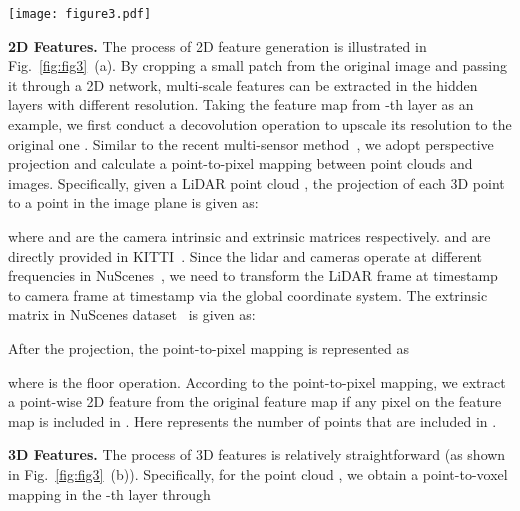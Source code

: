\documentclass[runningheads]{llncs}
\begin{document}
	
	\begin{figure*}[t]
		\begin{centering}
			\texttt{[image: figure3.pdf]}
			\caption{\textbf{2D and 3D feature generation.} 
Part (a) demonstrates the 2D feature generation, where the point cloud will first be projected onto the image patch and generate the point-to-pixel (P2P) mapping.
After that, it transfers the 2D feature map to the point-wise 2D features according to P2P mapping.
Part (b) shows the 3D feature generation.
The point-to-voxel (P2V) mapping is easy to obtain, and the voxel features will be interpolated onto the point cloud.
			}
			\label{fig:fig3}
		\end{centering}	
	\end{figure*}
	
	
	\noindent\textbf{2D Features.}
The process of 2D feature generation is illustrated in Fig.~\ref{fig:fig3}~(a).
By cropping a small patch  from the original image and passing it through a 2D network, multi-scale features can be extracted in the hidden layers with different resolution.
Taking the feature map  from -th layer as an example, we first conduct a decovolution operation to upscale its resolution to the original one .
Similar to the recent multi-sensor method~\cite{zhuang2021perception}, we adopt perspective projection and calculate a point-to-pixel mapping between point clouds and images.
Specifically, given a LiDAR point cloud , the projection of each 3D point  to a point  in the image plane is given as:
	
	where  and  are the camera intrinsic and extrinsic matrices respectively.
 and  are directly provided in KITTI~\cite{geiger2012cvpr}.
Since the lidar and cameras operate at different frequencies in NuScenes~\cite{nuscenes}, we need to transform the LiDAR frame at timestamp  to camera frame at timestamp  via the global coordinate system.
	The extrinsic matrix  in NuScenes dataset~\cite{nuscenes} is given as:
	
After the projection, the point-to-pixel mapping is represented as 
	
	where  is the floor operation.
According to the point-to-pixel mapping, we extract a point-wise 2D feature  from the original feature map  if any pixel on the feature map is included in .
Here  represents the number of points that are included in .
	
	\noindent\textbf{3D Features.}
	The process of 3D features is relatively straightforward (as shown in Fig.~\ref{fig:fig3}~(b)).
Specifically, for the point cloud , we obtain a point-to-voxel mapping in the -th layer through  
	
\end{document}
